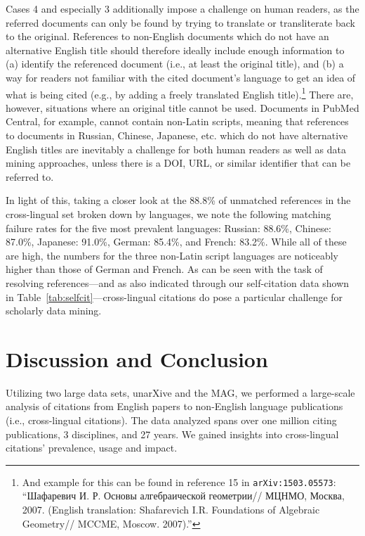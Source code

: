 Cases 4 and especially 3 additionally impose a challenge on human readers, as the referred documents can only be found by trying to translate or transliterate back to the original. References to non-English documents which do not have an alternative English title should therefore ideally include enough information to (a) identify the referenced document (i.e., at least the original title), and (b) a way for readers not familiar with the cited document's language to get an idea of what is being cited (e.g., by adding a freely translated English title).\footnote{And example for this can be found in reference 15 in \texttt{arXiv:1503.05573}: ``\foreignlanguage{russian}{Шафаревич И. Р. Основы алгебраической геометрии// МЦНМО, Москва, 2007.} (English translation: Shafarevich I.R. Foundations of Algebraic Geometry// MCCME, Moscow. 2007).''} There are, however, situations where an original title cannot be used. Documents in PubMed Central, for example, cannot contain non-Latin scripts, meaning that references to documents in Russian, Chinese, Japanese, etc. which do not have alternative English titles are inevitably a challenge for both human readers as well as data mining approaches, unless there is a DOI, URL, or similar identifier that can be referred to.

In light of this, taking a closer look at the 88.8\% of unmatched references in the cross-lingual set broken down by languages, we note the following matching failure rates for the five most prevalent languages: Russian: 88.6\%, Chinese: 87.0\%, Japanese: 91.0\%, German: 85.4\%, and French: 83.2\%. While all of these are high, the numbers for the three non-Latin script languages are noticeably higher than those of German and French. As can be seen with the task of resolving references---and as also indicated through our self-citation data shown in Table~\ref{tab:selfcit}---cross-lingual citations do pose a particular challenge for scholarly data mining.

\section{Discussion and Conclusion}
\label{sec:xling-conclusion}

Utilizing two large data sets, unarXive and the MAG, we performed a large-scale analysis of citations from English papers to non-English language publications (i.e., cross-lingual citations). The data analyzed spans over one million citing publications, 3 disciplines, and 27 years. We gained insights into cross-lingual citations' prevalence, usage and impact.

